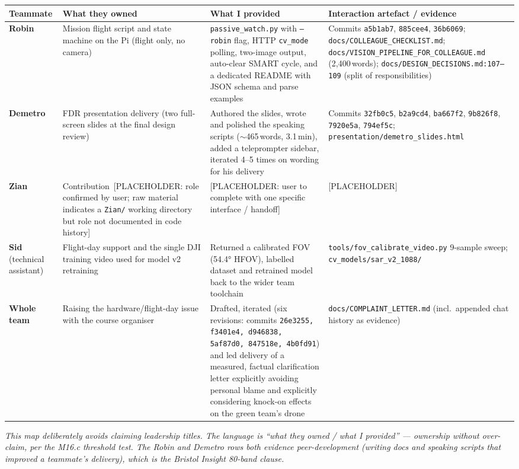 \vspace{0.5em}
\footnotesize
{}
\renewcommand{\arraystretch}{1.25}
\begin{tabular}{@{}p{1.8cm} p{4.0cm} p{4.0cm} p{4.0cm}@{}}
\toprule
\textbf{Teammate} & \textbf{What they owned} & \textbf{What I provided} & \textbf{Interaction artefact / evidence} \\
\midrule
\textbf{Robin} & Mission flight script and state machine on the Pi (flight only, no camera) & \texttt{passive\_watch.py} with \texttt{--robin} flag, HTTP \texttt{cv\_mode} polling, two-image output, auto-clear SMART cycle, and a dedicated README with JSON schema and parse examples & Commits \texttt{a5b1ab7}, \texttt{885cee4}, \texttt{36b6069}; \texttt{docs/COLLEAGUE\_CHECKLIST.md}; \texttt{docs/VISION\_PIPELINE\_FOR\_COLLEAGUE.md} (2{,}400\,words); \texttt{docs/DESIGN\_DECISIONS.md:107--109} (split of responsibilities) \\
\textbf{Demetro} & FDR presentation delivery (two full-screen slides at the final design review) & Authored the slides, wrote and polished the speaking scripts ($\sim$465\,words, 3.1\,min), added a teleprompter sidebar, iterated 4--5 times on wording for his delivery & Commits \texttt{32fb0c5}, \texttt{b2a9cd4}, \texttt{ba667f2}, \texttt{9b826f8}, \texttt{7920e5a}, \texttt{794ef5c}; \texttt{presentation/demetro\_slides.html} \\
\textbf{Zian} & Contribution~[PLACEHOLDER: role confirmed by user; raw material indicates a \texttt{Zian/} working directory but role not documented in code history] & [PLACEHOLDER: user to complete with one specific interface / handoff] & [PLACEHOLDER] \\
\textbf{Sid} (technical assistant) & Flight-day support and the single DJI training video used for model v2 retraining & Returned a calibrated FOV (54.4° HFOV), labelled dataset and retrained model back to the wider team toolchain & \texttt{tools/fov\_calibrate\_video.py} 9-sample sweep; \texttt{cv\_models/sar\_v2\_1088/} \\
\textbf{Whole team} & Raising the hardware/flight-day issue with the course organiser & Drafted, iterated (six revisions: commits \texttt{26e3255, f3401e4, d946838, 5af87d0, 847518e, 4b0fd91}) and led delivery of a measured, factual clarification letter explicitly avoiding personal blame and explicitly considering knock-on effects on the green team's drone & \texttt{docs/COMPLAINT\_LETTER.md} (incl.\ appended chat history as evidence) \\
\bottomrule
\end{tabular}
\renewcommand{\arraystretch}{1.0}
\normalsize

\vspace{0.5em}
\noindent\textit{This map deliberately avoids claiming leadership titles. The language
is ``what they owned / what I provided'' --- ownership without over-claim, per the
M16.c threshold test. The Robin and Demetro rows both evidence peer-development
(writing docs and speaking scripts that improved a teammate's delivery), which is the
Bristol Insight 80-band clause.}


